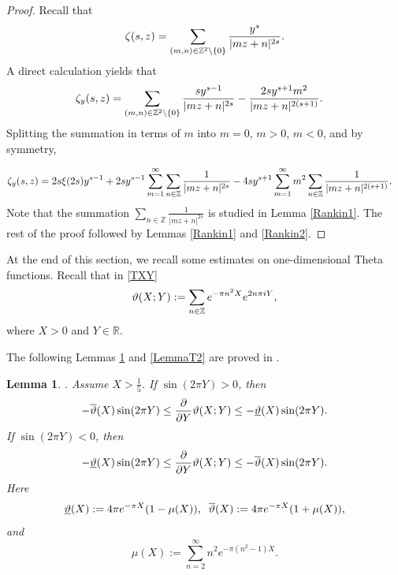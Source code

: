 \documentclass[reqno,english]{amsart}
\newtheorem{lemma}{Lemma}[section]
\newtheorem{open problem}{Open Problem}[section]
\newtheorem{open question}{Open Question}[section]
\newtheorem{open questions on hexagonal lattice}{Open Questions on hexagonal lattice}[section]
\newcommand{\R}{{\mathbb R}}
\begin{document}
\begin{proof}
Recall that
 \begin{equation}\aligned\nonumber
\zeta(s,z)=\sum_{(m,n)\in\mathbb{Z}^2\backslash\{0\}}\frac{y^s}{|mz+n|^{2s}}.
\endaligned\end{equation}
A direct calculation yields that
 \begin{equation}\aligned\nonumber
\zeta_y(s,z)&=\sum_{(m,n)\in\mathbb{Z}^2\backslash\{0\}}\frac{sy^{s-1}}{|mz+n|^{2s}}-\frac{2sy^{s+1}m^2}{|mz+n|^{2(s+1)}}.
\endaligned\end{equation}
Splitting the summation in terms of $m$ into $m=0$, $m>0$, $m<0$, and by symmetry,

 \begin{equation}\aligned\nonumber
\zeta_y(s,z)&=2s\xi(2s)y^{s-1}+2sy^{s-1}\sum_{m=1}^\infty\sum_{n\in\mathbb{Z}}\frac{1}{|mz+n|^{2s}}
-4sy^{s+1}\sum_{m=1}^\infty m^2\sum_{n\in\mathbb{Z}}\frac{1}{|mz+n|^{2(s+1)}}.
\endaligned\end{equation}
Note that the summation $\sum_{n\in\mathbb{Z}}\frac{1}{|mz+n|^{2s}}$ is studied in Lemma \ref{Rankin1}. The rest of the proof
 followed by Lemmas \ref{Rankin1} and \ref{Rankin2}.


\end{proof}
At the end of this section, we recall some estimates on one-dimensional Theta functions.
Recall that in \eqref{TXY}
\begin{equation}\aligned\nonumber
\vartheta(X;Y):=\sum_{n\in\mathbb{Z}} e^{-\pi n^2 X} e^{2n\pi i Y},
 \endaligned\end{equation}
 where $X>0$ and $Y\in\R$.


The following Lemmas \ref{LemmaT1} and \ref{LemmaT2} are proved in \cite{LW2022}.
\begin{lemma}\label{LemmaT1}\cite{LW2022}. Assume $X>\frac{1}{5}$. If $\sin(2\pi Y)>0$, then
\begin{equation}\aligned\nonumber
-\overline\vartheta(X)\sin(2\pi Y)\leq\frac{\partial}{\partial Y}\vartheta(X;Y)\leq-\underline\vartheta(X)\sin(2\pi Y).
 \endaligned\end{equation}
If $\sin(2\pi Y)<0$, then
\begin{equation}\aligned\nonumber
-\underline\vartheta(X)\sin(2\pi Y)\leq\frac{\partial}{\partial Y}\vartheta(X;Y)\leq-\overline\vartheta(X)\sin(2\pi Y).
 \endaligned\end{equation}
Here
\begin{equation}\aligned\nonumber
\underline\vartheta(X):=4\pi e^{-\pi X}(1-\mu(X)), \;\; \overline\vartheta(X):=4\pi e^{-\pi X}(1+\mu(X)),
 \endaligned\end{equation}
and
\begin{equation}\label{mmmx}
\mu(X):=\sum_{n=2}^\infty n^2 e^{-\pi(n^2-1)X}.
\end{equation}

\end{lemma}
\end{document}
